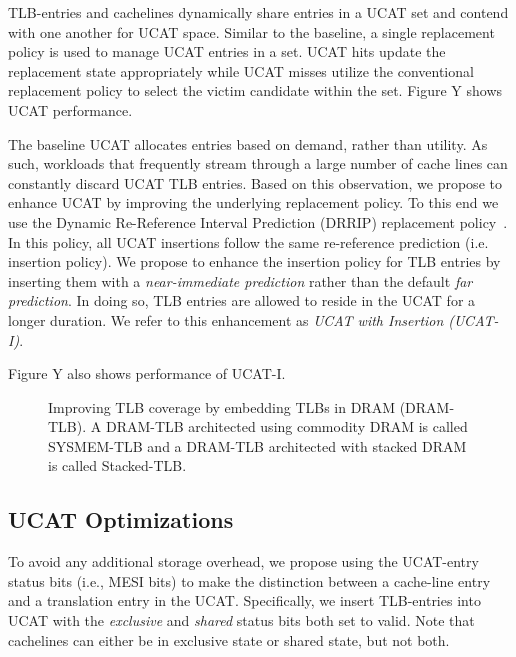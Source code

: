TLB-entries and cachelines dynamically share entries in a UCAT
set and contend with one another for UCAT space. Similar to the baseline, a single
replacement policy is used to manage UCAT entries in a set. UCAT hits
update the replacement state appropriately while UCAT misses utilize
the conventional replacement policy to select the victim candidate
within the set. Figure Y shows UCAT performance.

The baseline UCAT allocates entries based on demand, rather than
utility. As such, workloads that frequently stream through a large
number of cache lines can constantly discard UCAT TLB entries. Based on this observation,
we propose to enhance UCAT by improving the underlying replacement
policy. To this end we use the Dynamic Re-Reference Interval
Prediction (DRRIP) replacement policy~\cite{}. In this
policy, all UCAT insertions follow the same re-reference prediction
(i.e. insertion policy). We propose to enhance the insertion policy
for TLB entries by inserting them with a {\em near-immediate
prediction} rather than the default {\em far prediction}. In doing
so, TLB entries are allowed to reside in the UCAT for a longer
duration. We refer to this enhancement as {\em UCAT with Insertion
(UCAT-I)}.

Figure Y also shows performance of UCAT-I.

\begin{figure*}[t] 
  \vspace{-0. in} \centering
   \centerline{}

  \caption{\small Improving TLB coverage by embedding TLBs in DRAM
    (DRAM-TLB). A DRAM-TLB architected using commodity DRAM is called
    SYSMEM-TLB and a DRAM-TLB architected with stacked DRAM is called
    Stacked-TLB. \normalsize}
  \label{fig:stacked_tlb} 
  \vspace{-0. in}
\end{figure*}

\subsection{UCAT Optimizations}

To avoid any additional storage overhead, we propose using the
UCAT-entry status bits (i.e., MESI bits) to make the distinction between 
a cache-line entry and a translation entry in the UCAT.
Specifically, we insert TLB-entries into UCAT with the {\em exclusive}
and {\em shared} status bits both set to valid. Note that cachelines can
either be in exclusive state or shared state, but not both.

